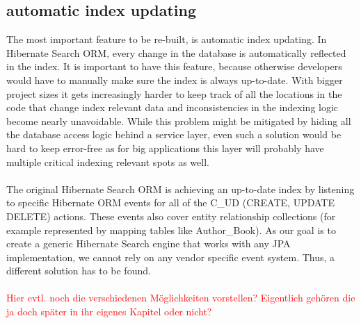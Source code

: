 \subsection{automatic index updating}
The most important feature to be re-built, is automatic index updating. In Hibernate Search ORM, every change in the database is automatically reflected in the index. It is important to have this feature, because otherwise developers would have to manually make sure the index is always up-to-date. With bigger project sizes it gets increasingly harder to keep track of all the locations in the code that change index relevant data and inconsistencies in the indexing logic become nearly unavoidable. While this problem might be mitigated by hiding all the database access logic behind a service layer, even such a solution would be hard to keep error-free as for big applications this layer will probably have multiple critical indexing relevant spots as well.
\\\\
The original Hibernate Search ORM is achieving an up-to-date index by listening to specific Hibernate ORM events for all of the C\_UD (CREATE, UPDATE DELETE) actions. These events also cover entity relationship collections (for example represented by mapping tables like Author\_Book). As our goal is to create a generic Hibernate Search engine that works with any JPA implementation, we cannot rely on any vendor specific event system. Thus, a different solution has to be found.
\\\\
\textcolor{red}{Hier evtl. noch die verschiedenen Möglichkeiten vorstellen? Eigentlich gehören die ja doch später in ihr eigenes Kapitel oder nicht?}

\pagebreak
